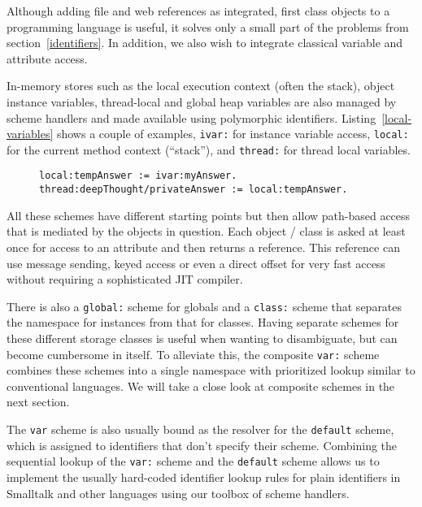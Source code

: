 \documentclass[preprint,authoryear]{acm_proc_article-sp}
\begin{document}
Although adding file and web references as integrated, first class objects to a programming
language is useful, it solves only a small part of the problems from section~\ref{identifiers}.
In addition, we also wish to integrate classical variable and attribute access.

In-memory stores such as the local execution context (often the stack), object instance
variables, thread-local and global heap variables are also managed by scheme handlers
and made available using polymorphic identifiers.  Listing~\ref{local-variables} shows
a couple of examples, {\tt ivar:} for instance variable access, {\tt local:} for the current
method context (``stack''), and {\tt thread:} for thread local variables.

\begin{figure}[htbp]
\begin{lstlisting}[style=numbers,label=local-variables,caption=Different memory variables.]
local:tempAnswer := ivar:myAnswer.
thread:deepThought/privateAnswer := local:tempAnswer.
\end{lstlisting}
\end{figure}

All these schemes have different starting points but then allow path-based access
that is mediated by the objects in question.   Each object / class is asked at least
once for access to an attribute and then returns a reference.   This reference can
use message sending, keyed access or even a direct offset for very fast
access without requiring a sophisticated JIT compiler.

There is also a {\tt global:} scheme for globals and a {\tt class:} scheme that separates
the namespace for instances from that for classes.  Having separate schemes for
these different storage classes is useful when wanting to disambiguate,
but can become cumbersome in itself.  To alleviate this, the composite
{\tt var:} scheme combines these schemes into a single namespace
with prioritized lookup similar to conventional languages.  We will take
a close look at composite schemes in the next section.  

The {\tt var} scheme is also usually bound as the resolver for the {\tt default}
scheme, which is assigned to identifiers that don't specify their scheme.
Combining the sequential lookup of the {\tt var:} scheme and the {\tt default}
scheme allows us to implement the usually hard-coded identifier lookup
rules for plain identifiers in Smalltalk and other languages using
our toolbox of scheme handlers.
\end{document}
